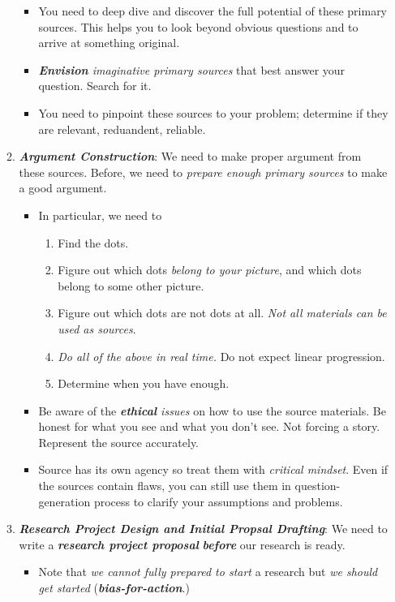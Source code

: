 \documentclass[11pt]{article}
\begin{document}
\begin{itemize}
\begin{enumerate}
\begin{itemize}
\item You need to deep dive and discover the full potential of these primary sources.  This helps you to look beyond obvious questions and to arrive at something original.

\item \emph{\textbf{Envision} imaginative primary sources} that best answer your question. Search for it.

\item You need to pinpoint these sources to your problem; determine if they are relevant, reduandent, reliable. 
\end{itemize}

\item \emph{\textbf{Argument Construction}}: We need to make proper argument from these sources. Before, we need to \emph{prepare enough primary sources} to make a good argument. 
\begin{itemize}
\item In particular, we need to 
\begin{enumerate}
\item Find the dots. 
\item Figure out which dots \emph{belong to your picture}, and which dots belong to some other picture. 
\item Figure out which dots are not dots at all. \emph{Not all materials can be used as sources}. 
\item \emph{Do all of the above in real time.} Do not expect linear progression. 
\item Determine when you have enough.
\end{enumerate}

\item Be aware of the \emph{\textbf{ethical} issues} on how to use the source materials. Be honest for what you see and what you don't see. Not forcing a story. Represent the source accurately. 

\item Source has its own agency so treat them with \emph{critical mindset}. Even if the sources contain flaws, you can still use them in question-generation process to clarify your assumptions and problems. 
\end{itemize}
 
\item  \emph{\textbf{Research Project Design and Initial Propsal Drafting}}: We need to write a \emph{\textbf{research project proposal}} \emph{\textbf{before}} our research is ready. 
\begin{itemize}
\item Note that \emph{we cannot fully prepared to start} a research but \emph{we should get started} (\emph{\textbf{bias-for-action}}.)  


\end{itemize}
\end{enumerate}
\end{itemize}
\end{document}
